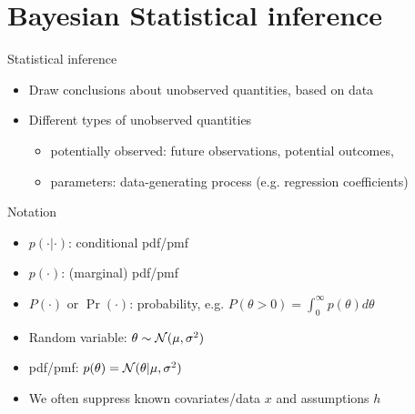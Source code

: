 \documentclass[10pt]{beamer}
\begin{document}
\section{Bayesian Statistical inference}
\frame{\sectionpage}

\begin{frame}{Statistical inference}
  \begin{itemize}
  \item Draw conclusions about {\color{uured} unobserved} quantities, based on {\color{uured} data} \pause
  \item Different types of unobserved quantities
    \begin{itemize}
    \item {\color{uured} potentially observed}: future observations, potential outcomes,
    \item {\color{uured} parameters}: data-generating process (e.g. regression coefficients)
    \end{itemize}
  \end{itemize}
\end{frame}

\begin{frame}{Notation}

  \begin{itemize}
    \item $p(\cdot|\cdot)$: conditional pdf/pmf
    \item $p(\cdot)$: (marginal) pdf/pmf
    \item $P(\cdot)$ or $\Pr(\cdot)$: probability, e.g. $P(\theta > 0) = \int_0^\infty p(\theta) d\theta$
    \item Random variable: $\theta \sim \mathcal{N}(\mu,\sigma^2)$
    \item pdf/pmf: $p(\theta) = \mathcal{N}(\theta | \mu,\sigma^2)$
    \item We often suppress known covariates/data $x$ and assumptions $h$
  \end{itemize}

\end{frame}
\end{document}
